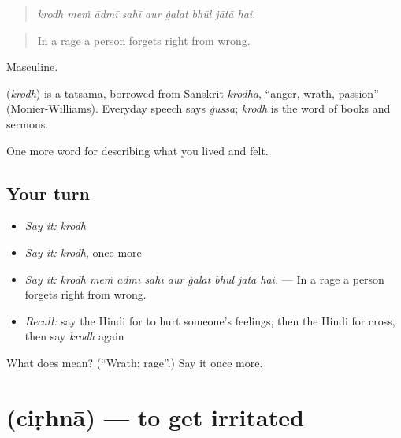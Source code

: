 \begin{quote}
\emph{krodh meṁ ādmī sahī aur ġalat bhūl jātā hai.}
\end{quote}

\begin{quote}
In a rage a person forgets right from wrong.
\end{quote}

Masculine.

\begin{cousinweb}
\textbf{} (\emph{krodh}) is a tatsama, borrowed from Sanskrit \emph{krodha}, \textquotedblleft{}anger, wrath, passion\textquotedblright{} (Monier-Williams). Everyday speech says \emph{ġussā}; \emph{krodh} is the word of books and sermons.
\end{cousinweb}

\begin{grammarlens}[title={What you've built}]
One more word for describing what you lived and felt.
\end{grammarlens}

\subsection*{Your turn}
\begin{itemize}
\raggedright
  \item \emph{Say it:} \emph{krodh}
  \item \emph{Say it:} \emph{krodh}, once more
  \item \emph{Say it:} \emph{krodh meṁ ādmī sahī aur ġalat bhūl jātā hai.} — In a rage a person forgets right from wrong.
  \item \emph{Recall:} say the Hindi for to hurt someone's feelings, then the Hindi for cross, then say \emph{krodh} again
\end{itemize}

\begin{tcolorbox}[breakable,colback=teal!4,colframe=teal!35!black,title={Before you move on}]
What does  mean? (\textquotedblleft{}Wrath; rage\textquotedblright{}.) Say it once more.
\end{tcolorbox}
\section[\texorpdfstring{\hi{चिढ़ना} (ciṛhnā)}{चिढ़ना (ciṛhnā)}]{ (ciṛhnā) — to get irritated}

\label{lesson:HI-C456-cirhna}



